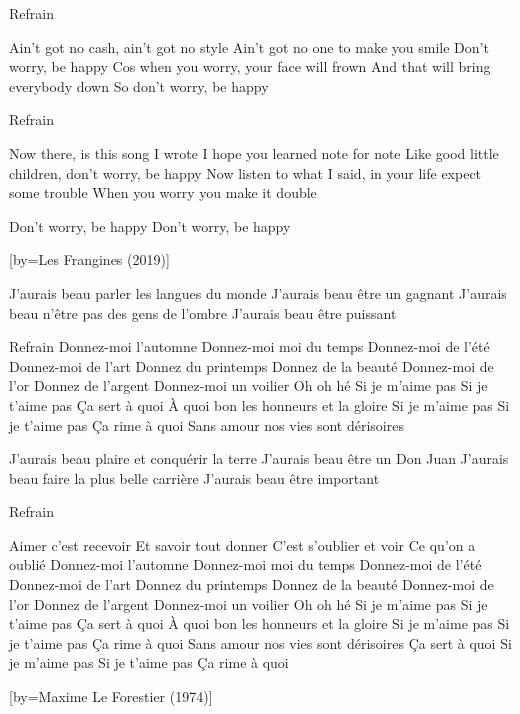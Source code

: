 \beginverse
Refrain
\endverse

\beginverse
Ain't got no cash, ain't got no style
Ain't got no one to make you smile 
Don't worry, be happy Cos when you worry, your face will frown
And that will bring everybody down 
So don't worry, be happy 
\endverse

\beginverse
Refrain
\endverse

\beginverse
Now there, is this song I wrote
I hope you learned note for note
Like good little children, don’t worry, be happy
Now listen to what I said, in your life expect some trouble
When you worry you make it double
\endverse

\beginverse
Don't worry, be happy 
Don't worry, be happy
\endverse

[by={Les Frangines (2019)}]

\beginverse
J'aurais beau parler les langues du monde
J'aurais beau être un gagnant
J'aurais beau n'être pas des gens de l'ombre
J'aurais beau être puissant
\endverse

\beginverse
Refrain
Donnez-moi l'automne
Donnez-moi moi du temps
Donnez-moi de l'été
Donnez-moi de l'art
Donnez du printemps
Donnez de la beauté
Donnez-moi de l'or
Donnez de l'argent
Donnez-moi un voilier
Oh oh hé
Si je m'aime pas
Si je t'aime pas
Ça sert à quoi
À quoi bon les honneurs et la gloire
Si je m'aime pas
Si je t'aime pas
Ça rime à quoi
Sans amour nos vies sont dérisoires
\endverse

\beginverse
J'aurais beau plaire et conquérir la terre
J'aurais beau être un Don Juan
J'aurais beau faire la plus belle carrière
J'aurais beau être important
\endverse

\beginverse
Refrain
\endverse

\beginverse
Aimer c'est recevoir
Et savoir tout donner
C'est s'oublier et voir
Ce qu'on a oublié
Donnez-moi l'automne
Donnez-moi moi du temps
Donnez-moi de l'été
Donnez-moi de l'art
Donnez du printemps
Donnez de la beauté
Donnez-moi de l'or
Donnez de l'argent
Donnez-moi un voilier
Oh oh hé
Si je m'aime pas
Si je t'aime pas
Ça sert à quoi
À quoi bon les honneurs et la gloire
Si je m'aime pas
Si je t'aime pas
Ça rime à quoi
Sans amour nos vies sont dérisoires
Ça sert à quoi
Si je m'aime pas
Si je t'aime pas
Ça rime à quoi
\endverse

[by={Maxime Le Forestier (1974)}]

